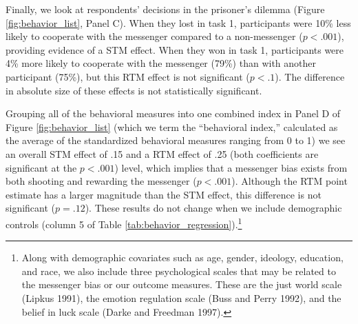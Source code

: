 Finally, we look at respondents' decisions in the prisoner's dilemma
(Figure \ref{fig:behavior_list}, Panel C). When they lost in task 1, participants were
10\% less likely to cooperate with the messenger compared to a
non-messenger ($p < .001$), providing evidence of a STM
effect. When they won in task 1, participants were 4\% more likely to
cooperate with the messenger (79\%) than with another participant
(75\%), but this RTM effect is not significant ($p < .1$).
The difference in absolute size of these effects is not statistically
significant.

Grouping all of the behavioral measures into one combined index in
Panel D of Figure \ref{fig:behavior_list} (which we term the ``behavioral index,''
calculated as the average of the standardized behavioral measures
ranging from 0 to 1) we see an overall
STM effect of .15 and a RTM effect of .25 (both coefficients are
significant at the $p < .001$) level, which implies that
a messenger bias exists from both shooting and rewarding the messenger
($p < .001$). Although the RTM point estimate has a larger
magnitude than the STM effect, this difference is not significant ($p
= .12$). These results do not change when we include
demographic controls (column 5 of Table \ref{tab:behavior_regression}).\footnote{Along with demographic covariates such as age, gender, ideology, education, and race, we also include three psychological scales that may be related to the messenger bias or our outcome measures. These are the just world scale (Lipkus 1991), the emotion regulation scale (Buss and Perry 1992), and the belief in luck scale (Darke and Freedman 1997).}



